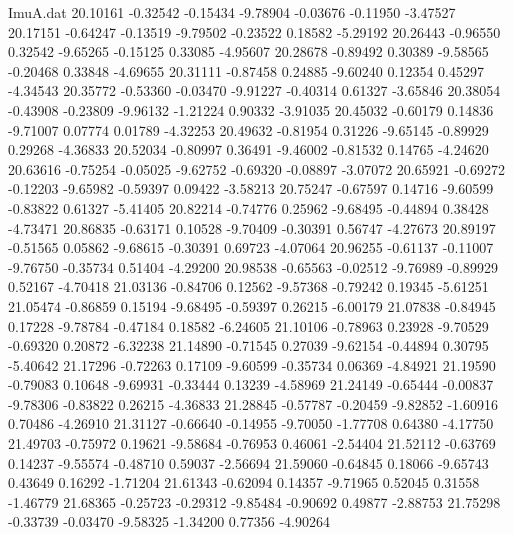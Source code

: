 \begin{filecontents}{ImuA.dat}
  20.10161   -0.32542   -0.15434   -9.78904   -0.03676   -0.11950   -3.47527
  20.17151   -0.64247   -0.13519   -9.79502   -0.23522    0.18582   -5.29192
  20.26443   -0.96550    0.32542   -9.65265   -0.15125    0.33085   -4.95607
  20.28678   -0.89492    0.30389   -9.58565   -0.20468    0.33848   -4.69655
  20.31111   -0.87458    0.24885   -9.60240    0.12354    0.45297   -4.34543
  20.35772   -0.53360   -0.03470   -9.91227   -0.40314    0.61327   -3.65846
  20.38054   -0.43908   -0.23809   -9.96132   -1.21224    0.90332   -3.91035
  20.45032   -0.60179    0.14836   -9.71007    0.07774    0.01789   -4.32253
  20.49632   -0.81954    0.31226   -9.65145   -0.89929    0.29268   -4.36833
  20.52034   -0.80997    0.36491   -9.46002   -0.81532    0.14765   -4.24620
  20.63616   -0.75254   -0.05025   -9.62752   -0.69320   -0.08897   -3.07072
  20.65921   -0.69272   -0.12203   -9.65982   -0.59397    0.09422   -3.58213
  20.75247   -0.67597    0.14716   -9.60599   -0.83822    0.61327   -5.41405
  20.82214   -0.74776    0.25962   -9.68495   -0.44894    0.38428   -4.73471
  20.86835   -0.63171    0.10528   -9.70409   -0.30391    0.56747   -4.27673
  20.89197   -0.51565    0.05862   -9.68615   -0.30391    0.69723   -4.07064
  20.96255   -0.61137   -0.11007   -9.76750   -0.35734    0.51404   -4.29200
  20.98538   -0.65563   -0.02512   -9.76989   -0.89929    0.52167   -4.70418
  21.03136   -0.84706    0.12562   -9.57368   -0.79242    0.19345   -5.61251
  21.05474   -0.86859    0.15194   -9.68495   -0.59397    0.26215   -6.00179
  21.07838   -0.84945    0.17228   -9.78784   -0.47184    0.18582   -6.24605
  21.10106   -0.78963    0.23928   -9.70529   -0.69320    0.20872   -6.32238
  21.14890   -0.71545    0.27039   -9.62154   -0.44894    0.30795   -5.40642
  21.17296   -0.72263    0.17109   -9.60599   -0.35734    0.06369   -4.84921
  21.19590   -0.79083    0.10648   -9.69931   -0.33444    0.13239   -4.58969
  21.24149   -0.65444   -0.00837   -9.78306   -0.83822    0.26215   -4.36833
  21.28845   -0.57787   -0.20459   -9.82852   -1.60916    0.70486   -4.26910
  21.31127   -0.66640   -0.14955   -9.70050   -1.77708    0.64380   -4.17750
  21.49703   -0.75972    0.19621   -9.58684   -0.76953    0.46061   -2.54404
  21.52112   -0.63769    0.14237   -9.55574   -0.48710    0.59037   -2.56694
  21.59060   -0.64845    0.18066   -9.65743    0.43649    0.16292   -1.71204
  21.61343   -0.62094    0.14357   -9.71965    0.52045    0.31558   -1.46779
  21.68365   -0.25723   -0.29312   -9.85484   -0.90692    0.49877   -2.88753
  21.75298   -0.33739   -0.03470   -9.58325   -1.34200    0.77356   -4.90264

\end{filecontents}
